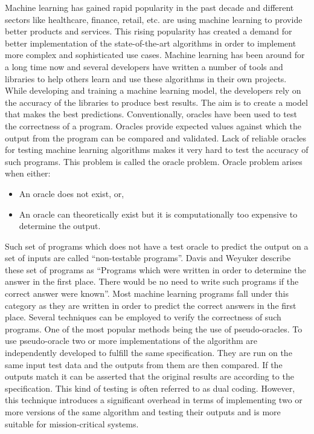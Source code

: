 Machine learning has gained rapid popularity in the past decade and different sectors like healthcare, finance, retail, etc. are using machine learning to provide better products and services. This rising popularity has created a demand for better implementation of the state-of-the-art algorithms in order to implement more complex and sophisticated use cases. Machine learning has been around for a long time now and several developers have written a number of tools and libraries to help others learn and use these algorithms in their own projects.  While developing and training a machine learning model, the developers rely on the accuracy of the libraries to produce best results. The aim is to create a model that makes the best predictions.
Conventionally, oracles have been used to test the correctness of a program. Oracles provide expected values against which the output from the program can be compared and validated. Lack of reliable oracles for testing machine learning algorithms makes it very hard to test the accuracy of such programs. This problem is called the oracle problem\cite{Weyuker}. Oracle problem arises when either:
\begin{itemize}
  \item An oracle does not exist, or,
  \item An oracle can theoretically exist but it is computationally too expensive to determine the output.
\end{itemize}
Such set of programs which does not have a test oracle to predict the output on a set of inputs are called \enquote{non-testable programs}\cite{Weyuker}. Davis and Weyuker describe these set of programs as \enquote{Programs which were written in order to determine the answer in the first place. There would be no need to write such programs if the correct answer were known}\cite{Davis1981}. Most machine learning programs fall under this category as they are written in order to predict the correct answers in the first place. Several techniques can be employed to verify the correctness of such programs. One of the most popular methods being the use of pseudo-oracles. To use pseudo-oracle two or more implementations of the algorithm are independently developed to fulfill the same specification. They are run on the same input test data and the outputs from them are then compared. If the outputs match it can be asserted that the original results are according to the specification. This kind of testing is often referred to as dual coding. However, this technique introduces a significant overhead in terms of implementing two or more versions of the same algorithm and testing their outputs and is more suitable for mission-critical systems\cite{Weyuker}.\newline

